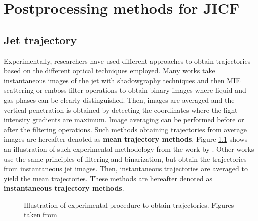 \chapter{Postprocessing methods for JICF}
\label{app:postproc_method_JICF}

\section{Jet trajectory}
\label{app:processing_JICF_trajectories}



Experimentally, researchers have used different approaches to obtain trajectories based on the different optical techniques employed. Many works  take instantaneous images of the jet with shadowgraphy techniques and then MIE scattering or emboss-filter operations to obtain binary images where liquid and gas phases can be clearly distinguished. Then, images are averaged and the vertical penetration is obtained by detecting the coordinates where the light intensity gradients are maximum. Image averaging can be performed before or after the filtering operations. Such methods obtaining trajectories from average images are hereafter denoted as \textbf{mean trajectory methods}. Figure \ref{fig:expe_obtention_of_trajectories} shows an illustration of such experimental methodology from the work by . Other works  use the same principles of filtering and binarization, but obtain the trajectories from instantaneous jet images. Then, instantaneous trajectories are averaged to yield the mean trajectories. These methods are hereafter denoted as \textbf{instantaneous trajectory methods}.

\begin{figure}[ht]
     \centering
     \caption{Illustration of experimental procedure to obtain trajectories. Figures taken from }
      \label{fig:expe_obtention_of_trajectories}
\end{figure}

